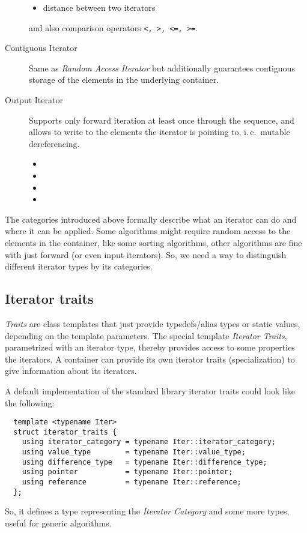 \begin{description}
\begin{itemize}
      \item {} distance between two iterators
    \end{itemize}
    and also comparison operators \texttt{<, >, <=, >=}.
  \item[Contiguous Iterator]
    Same as \emph{Random Access Iterator} but additionally guarantees contiguous storage of the elements in the underlying container.
  \item[Output Iterator]
    Supports only forward iteration at least once through the sequence, and allows to write to the elements the iterator is pointing to, i.\,e.\ mutable dereferencing.
    \begin{itemize}
      \item {}
      \item {}
      \item {}
      \item {}
    \end{itemize}
\end{description}

The categories introduced above formally describe what an iterator can do and where it can be applied. Some algorithms might require random access to
the elements in the container, like some sorting algorithms, other algorithms are fine with just forward (or even input iterators).
So, we need a way to distinguish different iterator types by its categories.

\subsection{Iterator traits}
\emph{Traits} are class templates that just provide typedefs/alias types or static values, depending on the template parameters. The special template
\emph{Iterator Traits}, parametrized with an iterator type, thereby provides access to some properties the iterators. A container can provide its
own iterator traits (specialization) to give information about its iterators.

A default implementation of the standard library iterator traits could look like the following:
\begin{verbatim}
  template <typename Iter>
  struct iterator_traits {
    using iterator_category = typename Iter::iterator_category;
    using value_type        = typename Iter::value_type;
    using difference_type   = typename Iter::difference_type;
    using pointer           = typename Iter::pointer;
    using reference         = typename Iter::reference;
  };
\end{verbatim}
%
So, it defines a type representing the \emph{Iterator Category} and some more types, useful for generic algorithms.

